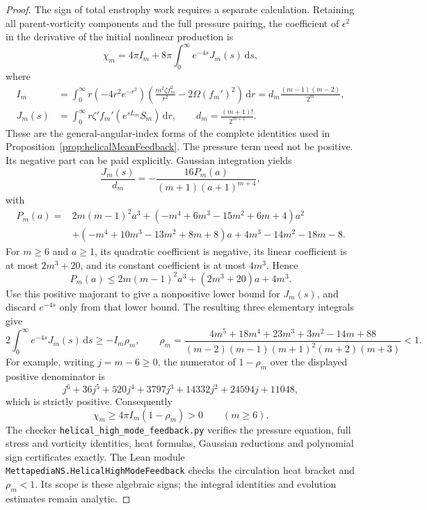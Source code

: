 \documentclass[11pt]{article}
\theoremstyle{remark}
\newcommand{\dd}{\,\mathrm d}
\begin{document}
\begin{proof}
The sign of total enstrophy work requires a separate calculation.
Retaining all parent-vorticity components and the full pressure pairing,
the coefficient of $\epsilon^2$ in the derivative of the initial
nonlinear production is
\[
 \chi_m=4\pi I_m+8\pi\int_0^\infty e^{-4s}J_m(s)\dd s,
\]
where
\begin{align*}
 I_m&=\int_0^\infty r(-4r^2e^{-r^2})
       \left(\frac{m^2\zeta f_m^2}{r^2}
                                -2\Omega(f_m')^2\right)\dd r
       =d_m\frac{(m-1)(m-2)}{2^m},\\
 J_m(s)&=\int_0^\infty r\zeta'f_m'
                                  (e^{sL_m}S_m)\dd r,
       \qquad d_m=\frac{(m+1)!}{2^{m+1}}.
\end{align*}
These are the general-angular-index forms of the complete identities
used in Proposition~\ref{prop:helicalMeanFeedback}.
The pressure term need not be positive. Its negative part can be paid
explicitly. Gaussian integration yields
\[
 \frac{J_m(s)}{d_m}
             =-\frac{16P_m(a)}{(m+1)(a+1)^{m+4}},
\]
with
\begin{align*}
 P_m(a)={}&2m(m-1)^2a^3
       +(-m^4+6m^3-15m^2+6m+4)a^2\\
       &+(-m^4+10m^3-13m^2+8m+8)a
       +4m^3-14m^2-18m-8.
\end{align*}
For $m\geq6$ and $a\geq1$, its quadratic coefficient is negative,
its linear coefficient is at most $2m^3+20$, and its constant
coefficient is at most $4m^3$. Hence
\[
 P_m(a)\leq 2m(m-1)^2a^3+(2m^3+20)a+4m^3.
\]
Use this positive majorant to give a nonpositive lower bound for
$J_m(s)$, and discard $e^{-4s}$ only from that lower bound.
The resulting three elementary integrals give
\[
 2\int_0^\infty e^{-4s}J_m(s)\dd s\geq-I_m\rho_m,
 \qquad
 \rho_m=\frac{4m^5+18m^4+23m^3+3m^2-14m+88}
 {(m-2)(m-1)(m+1)^2(m+2)(m+3)}<1.
\]
For example, writing $j=m-6\geq0$, the numerator of $1-\rho_m$
over the displayed positive denominator is
\[
 j^6+36j^5+520j^4+3797j^3+14332j^2+24594j+11048,
\]
which is strictly positive. Consequently
\begin{equation}\label{eq:highModeProductionCoefficient}
 \chi_m\geq4\pi I_m(1-\rho_m)>0\qquad(m\geq6).
\end{equation}
The checker \texttt{helical\_high\_mode\_feedback.py} verifies the
pressure equation, full stress and vorticity identities, heat formulas,
Gaussian reductions and polynomial sign certificates exactly.
The Lean module \texttt{MettapediaNS.}\allowbreak\texttt{HelicalHighModeFeedback}
checks the circulation heat bracket and $\rho_m<1$. Its scope is these
algebraic signs; the integral identities and evolution estimates remain
analytic.


\end{proof}
\end{document}
